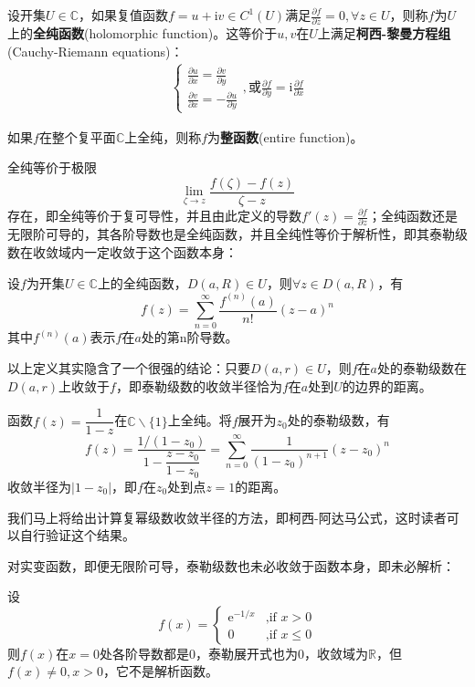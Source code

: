\begin{definition}[全纯函数]
    设开集$U\in\mathbb{C}$，如果复值函数$f=u+\mathrm{i}v\in C^1(U)$满足$\frac{\partial f}{\partial \overline{z}}=0,\forall z\in U$，则称$f$为$U$上的\textbf{全纯函数}(holomorphic function)。这等价于$u,v$在$U$上满足\textbf{柯西-黎曼方程组}(Cauchy-Riemann equations)：
    \begin{align*}
        \begin{cases}
        \frac{\partial u}{\partial x}=\frac{\partial v}{\partial y}\\
        \frac{\partial v}{\partial x}=-\frac{\partial u}{\partial y}
        \end{cases},\text{或}\frac{\partial f}{\partial y}= \mathrm{i}\frac{\partial f}{\partial x}
    \end{align*}
\end{definition}
\begin{definition}[整函数]
    如果$f$在整个复平面$\mathbb{C}$上全纯，则称$f$为\textbf{整函数}(entire function)。
\end{definition}

全纯等价于极限\[\lim_{\zeta\to z}\frac{f(\zeta)-f(z)}{\zeta-z}\]
存在，即全纯等价于复可导性，并且由此定义的导数$f'(z)=\frac{\partial f}{\partial z}$；全纯函数还是无限阶可导的，其各阶导数也是全纯函数，并且全纯性等价于解析性，即其泰勒级数在收敛域内一定收敛于这个函数本身：
\begin{definition}[复变函数的泰勒级数展开]
    设$f$为开集$U\in\mathbb{C}$上的全纯函数，$D(a,R)\in U$，则$\forall z\in D(a,R)$，有
    \[f(z)=\sum_{n=0}^{\infty}\frac{f^{(n)}(a)}{n!}(z-a)^n\]
    其中$f^{(n)}(a)$表示$f$在$a$处的第n阶导数。
\end{definition}

以上定义其实隐含了一个很强的结论：只要$D(a,r)\in U$，则$f$在$a$处的泰勒级数在$D(a,r)$上收敛于$f$，即泰勒级数的收敛半径恰为$f$在$a$处到$U$的边界的距离。
\begin{example}
    函数$f(z)=\dfrac{1}{1-z}$在$\mathbb{C}\backslash\{1\}$上全纯。将$f$展开为$z_0$处的泰勒级数，有
    \[f(z)=\frac{1/(1-z_0)}{1-\dfrac{z-z_0}{1-z_0}}=\sum_{n=0}^{\infty}\frac{1}{(1-z_0)^{n+1}}(z-z_0)^n\]
    收敛半径为$|1-z_0|$，即$f$在$z_0$处到点$z=1$的距离。

    我们马上将给出计算复幂级数收敛半径的方法，即柯西-阿达马公式，这时读者可以自行验证这个结果。
\end{example}

对实变函数，即便无限阶可导，泰勒级数也未必收敛于函数本身，即未必解析：
\begin{example}
    设$$f(x)=\begin{cases}
    \mathrm{e}^{-1/x}&\text{,if\ }x> 0\\
    0&\text{,if\ }x\leq 0
    \end{cases}$$
    则$f(x)$在$x=0$处各阶导数都是0，泰勒展开式也为0，收敛域为$\mathbb{R}$，但$f(x)\neq 0,x>0$，它不是解析函数。
\end{example}

